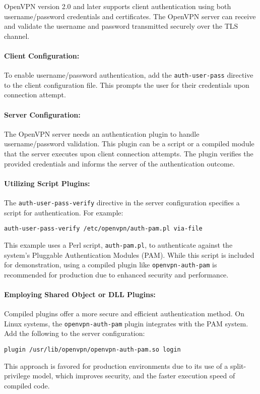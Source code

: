 OpenVPN version 2.0 and later supports client authentication using both username/password credentials and certificates. The OpenVPN server can receive and validate the username and password transmitted securely over the TLS channel.

\paragraph{Client Configuration:}
To enable username/password authentication, add the \texttt{auth-user-pass} directive to the client configuration file. This prompts the user for their credentials upon connection attempt.

\paragraph{Server Configuration:}
The OpenVPN server needs an authentication plugin to handle username/password validation. This plugin can be a script or a compiled module that the server executes upon client connection attempts. The plugin verifies the provided credentials and informs the server of the authentication outcome.

\paragraph{Utilizing Script Plugins:}
The \texttt{auth-user-pass-verify} directive in the server configuration specifies a script for authentication. For example:
\begin{verbatim}
auth-user-pass-verify /etc/openvpn/auth-pam.pl via-file
\end{verbatim}
This example uses a Perl script, \texttt{auth-pam.pl}, to authenticate against the system's Pluggable Authentication Modules (PAM). While this script is included for demonstration, using a compiled plugin like \texttt{openvpn-auth-pam} is recommended for production due to enhanced security and performance.

\paragraph{Employing Shared Object or DLL Plugins:}
Compiled plugins offer a more secure and efficient authentication method. On Linux systems, the \texttt{openvpn-auth-pam} plugin integrates with the PAM system. Add the following to the server configuration:
\begin{verbatim}
plugin /usr/lib/openvpn/openvpn-auth-pam.so login
\end{verbatim}
This approach is favored for production environments due to its use of a split-privilege model, which improves security, and the faster execution speed of compiled code.

